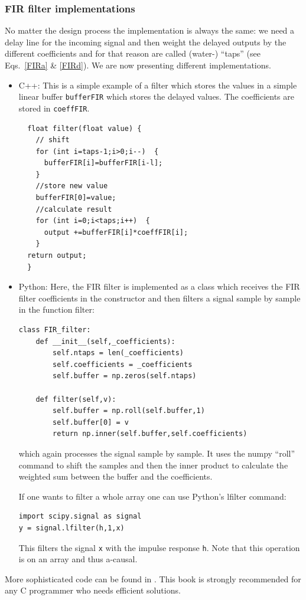 \documentclass[12pt,a4paper]{article}
\begin{document}
\subsubsection{FIR filter implementations}
No matter the design process the implementation is always the same: we
need a delay line for the incoming signal and then weight the delayed
outputs by the different coefficients and for that reason are called
(water-) ``taps'' (see Eqs.~\ref{FIRa} \& \ref{FIRd}). We are now presenting
different implementations.

\begin{itemize}
\item C++:
This is a simple example of a filter which stores the values
in a simple linear buffer \texttt{bufferFIR} which stores the
delayed values. The coefficients are stored in \texttt{coeffFIR}.
\begin{verbatim}
  float filter(float value) {
    // shift
    for (int i=taps-1;i>0;i--)  {
      bufferFIR[i]=bufferFIR[i-l];
    }
    //store new value
    bufferFIR[0]=value;
    //calculate result
    for (int i=0;i<taps;i++)  {
      output +=bufferFIR[i]*coeffFIR[i];
    }
  return output;
  }
\end{verbatim}

\item Python: Here, the FIR filter is implemented as a
  class which receives the FIR filter coefficients
  in the constructor and then filters a signal sample
  by sample in the function filter:
  
\begin{verbatim}
class FIR_filter:
    def __init__(self,_coefficients):
        self.ntaps = len(_coefficients)
        self.coefficients = _coefficients
        self.buffer = np.zeros(self.ntaps)

    def filter(self,v):
        self.buffer = np.roll(self.buffer,1)
        self.buffer[0] = v
        return np.inner(self.buffer,self.coefficients)
\end{verbatim}
which again processes the signal sample by sample. It uses
the numpy ``roll'' command to shift the samples and then
the inner product to calculate the weighted sum between
the buffer and the coefficients.

If one wants
to filter a whole array one can use Python's lfilter command:
\begin{verbatim}
import scipy.signal as signal
y = signal.lfilter(h,1,x)
\end{verbatim}
This filters the signal \texttt{x} with the impulse response
\texttt{h}. Note that this operation is on an array and thus
a-causal.
\end{itemize}
More sophisticated code can be found in \citet{NumericalRec2007}.
This book is strongly recommended for any C programmer who
needs efficient solutions.
\end{document}
